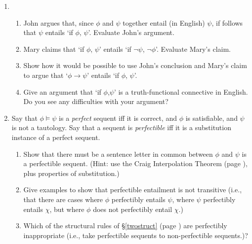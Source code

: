 {\begin{enumerate}
		\item \begin {enumerate} \item John argues that, since $\phi$ and $\psi$ together entail (in English)
		$\psi$, if follows that $\psi$ entails `if $\phi$, $\psi$'. Evaluate John's argument.

		\item Mary claims that `if $\phi$, $\psi$' entails `if $\neg \psi$, $\neg
		\phi$'. Evaluate Mary's claim.
		\item Show how it would be possible to use John's conclusion and
		Mary's claim to argue that `$\phi \to \psi$' entails `if $\phi$,
		$\psi$'.
		\item Give an argument that `if $\phi$,$\psi$' is a truth-functional connective in English. Do you see any difficulties with your argument?

		\end{enumerate}	
	
\item Say that $\phi \vDash \psi$ is a \emph{perfect} sequent iff it is correct, and $\phi$ is satisfiable, and	$\psi$ is not a tautology. Say that a sequent is \emph{perfectible} iff it is a substitution instance of a perfect sequent. \begin{enumerate}
	\item Show that there must be a sentence letter in common between $\phi$ and $\psi$ is a perfectible sequent. (Hint: use the Craig Interpolation Theorem (page \pageref{thmcraig}), plus properties of substitution.)
	\item Give examples to show that perfectible entailment is not transitive (i.e., that there are cases where $\phi$ perfectibly entails $\psi$, where $\psi$ perfectibly entails $\chi$, but where $\phi$ does not perfectibly entail $\chi$.)
	\item Which of the structural rules of \S\ref{twostruct} (page \pageref{twostruct}) are perfectibly inappropriate (i.e., take perfectible sequents to non-perfectible sequents.)?
\end{enumerate}
	

\end{enumerate}}
